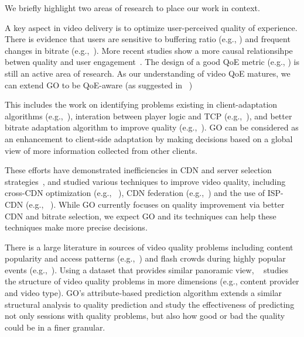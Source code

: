 We briefly highlight two areas of research to place our work in context.

A key aspect in  video delivery is to optimize user-perceived  quality of experience.  There is evidence that
users are sensitive to buffering ratio (e.g., \cite{sigcomm11}) and frequent changes in bitrate (e.g.,~\cite{user-adaptive,videoqoe}). More recent studies show a more causal relationsihpe betwen quality and user engagement~\cite{akamai-imc12}. The design of a good QoE metric (e.g., \cite{qscore}) is still an active area of research. As our understanding of video QoE matures, we can extend GO to be QoE-aware (as suggested in ~\cite{sekar2012quest})

 This includes the work on identifying problems existing in client-adaptation algorithms (e.g.,~\cite{mmsys2011cisco}), interation between player logic and TCP (e.g.,~\cite{usenix12_ghobadi,nossdav12_esteban}), and better bitrate adaptation algorithm to improve quality (e.g.,~\cite{nossdav12_akhshabi,festive}). GO can be considered as an enhancement to client-side adaptation by making decisions based on  a global view of more information collected from other clients.

 These efforts have demonstrated inefficiencies in CDN and server selection strategies~\cite{youtubecdn,youtube-infra}, and studied various techniques to improve video quality, including cross-CDN optimization (e.g., ~\cite{sigcomm12,sigcomm12cdnmulti}), CDN federation (e.g.,~\cite{peterson2013framework}) and the use of ISP-CDN (e.g., ~\cite{yu2012tradeoffs,frank2013pushing}).  While GO currently focuses on quality improvement via better CDN and bitrate selection, we expect GO and its techniques can help these techniques make more precise decisions.

  There is a large  literature in sources of video quality problems including content popularity and access patterns (e.g.,~\cite{youtube-imc07}\cite{plissonneau2012longitudinal}) and flash crowds during highly popular events (e.g.,~\cite{beijing-imc09}). Using a dataset that provides similar panoramic view, ~\cite{jiang2013shedding} studies the structure of video quality problems in more dimensions (e.g., content provider and video type). GO's attribute-based prediction algorithm extends a similar structural analysis to quality prediction and study the effectiveness of predicting not only sessions with quality problems, but also how good or bad the quality could be in a finer granular.

